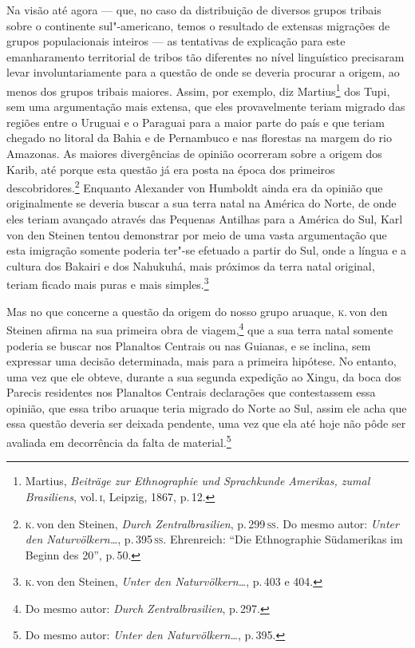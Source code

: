 Na visão até agora --- que, no caso da distribuição de diversos grupos
tribais sobre o continente sul"-americano, temos o resultado de extensas
migrações de grupos populacionais inteiros --- as tentativas de
explicação para este emanharamento territorial de tribos tão diferentes 
no nível linguístico precisaram levar involuntariamente para
a questão de onde se deveria procurar a origem, ao menos dos grupos
tribais maiores. Assim, por exemplo, diz Martius\footnote{Martius,
  \textit{Beiträge zur Ethnographie und Sprachkunde Amerikas, zumal
  Brasiliens}, vol.\,\textsc{i}, Leipzig, 1867, p.\,12.} dos Tupi, sem uma
argumentação mais extensa, que eles provavelmente teriam migrado das regiões
entre o Uruguai e o Paraguai para a maior parte do país e que teriam chegado
no litoral da Bahia e de Pernambuco e nas florestas na margem do rio
Amazonas. As maiores divergências de opinião ocorreram sobre a origem
dos Karib, até porque esta questão já era posta na época dos primeiros
descobridores.\footnote{\textsc{k}.\,von den Steinen, \textit{Durch
  Zentralbrasilien}, p.\,299\,\textsc{ss}. Do mesmo autor: \textit{Unter den Naturvölkern\ldots}, p.\,395\,\textsc{ss}. Ehrenreich: ``Die Ethnographie Südamerikas
  im Beginn des 20'', p.\,50.} Enquanto Alexander von Humboldt ainda
era da opinião que originalmente se deveria buscar a sua terra natal na
América do Norte, de onde eles teriam avançado através das Pequenas
Antilhas para a América do Sul, Karl von den Steinen tentou demonstrar
por meio de uma vasta argumentação que esta imigração somente poderia
ter"-se efetuado a partir do Sul, onde a língua e a cultura dos Bakairi e
dos Nahukuhá, mais próximos da terra natal original, teriam ficado
mais puras e mais simples.\footnote{\textsc{k}.\,von den Steinen, \textit{Unter den Naturvölkern\ldots}, p.\,403 e 404.}

Mas no que concerne a questão da origem do nosso grupo aruaque, \textsc{k}.\,von
den Steinen afirma na sua primeira obra de viagem,\footnote{Do mesmo
  autor: \textit{Durch Zentralbrasilien}, p.\,297.} que a sua terra natal
somente poderia se buscar nos Planaltos Centrais ou nas Guianas, e se
inclina, sem expressar uma decisão determinada, mais para a primeira
hipótese. No entanto, uma vez que ele obteve, durante a sua segunda
expedição ao Xingu, da boca dos Parecis residentes nos Planaltos
Centrais declarações que contestassem essa opinião, que essa tribo
aruaque teria migrado do Norte ao Sul, assim ele acha que essa questão
deveria ser deixada pendente, uma vez que ela até hoje não pôde ser
avaliada em decorrência da falta de material.\footnote{Do mesmo autor:
  \textit{Unter den Naturvölkern\ldots}, p.\,395.}

